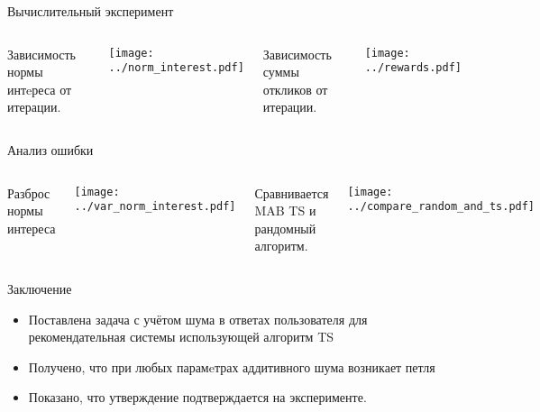 \documentclass{beamer}
\begin{document}
\begin{frame}{Вычислительный эксперимент}
\begin{columns}[c]
Зависимость нормы интeреса от итерации.
\begin{center}
  \texttt{[image: ../norm\_interest.pdf]}
\end{center}
Зависимость суммы откликов от итерации.  
\begin{center}
  \texttt{[image: ../rewards.pdf]}
\end{center}
\end{columns}

\end{frame}
\begin{frame}{Анализ ошибки}
\begin{columns}[T]

Разброс нормы интереса
\begin{center}
  \texttt{[image: ../var\_norm\_interest.pdf]}
\end{center}

Сравнивается MAB TS и рандомный алгоритм.
\begin{center}
  \texttt{[image: ../compare\_random\_and\_ts.pdf]}
\end{center}
\end{columns}
\end{frame}
\begin{frame}{Заключение}
  \begin{itemize}
      \item Поставлена задача с учётом шума в ответах пользователя для рекомендательная системы использующей алгоритм TS
      \item Получено, что при любых парамeтрах аддитивного шума возникает петля  
      \item Показано, что утверждение подтверждается на эксперименте.
  \end{itemize}
\end{frame}
\end{document}
